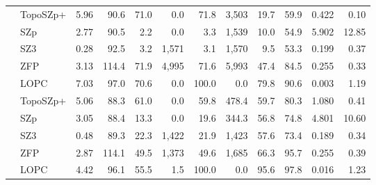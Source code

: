 \begin{tabular}{@{}llrrrrrrrrrr@{}}
\addlinespace[2pt]
\multirow{5}{*}{NYX} & TopoSZp+ & 5.96 & 90.6 & 71.0 & 0.0 & 71.8 & 3{,}503 & 19.7 & 59.9 & 0.422 & 0.10 \\
 & SZp & 2.77 & 90.5 & 2.2 & 0.0 & 3.3 & 1{,}539 & 10.0 & 54.9 & 5.902 & 12.85 \\
 & SZ3 & 0.28 & 92.5 & 3.2 & 1{,}571 & 3.1 & 1{,}570 & 9.5 & 53.3 & 0.199 & 0.37 \\
 & ZFP & 3.13 & 114.4 & 71.9 & 4{,}995 & 71.6 & 5{,}993 & 47.4 & 84.5 & 0.255 & 0.33 \\
 & LOPC & 7.03 & 97.0 & 70.6 & 0.0 & 100.0 & 0.0 & 79.8 & 90.6 & 0.003 & 1.19 \\
\addlinespace[2pt]
\multirow{5}{*}{SCALE} & TopoSZp+ & 5.06 & 88.3 & 61.0 & 0.0 & 59.8 & 478.4 & 59.7 & 80.3 & 1.080 & 0.41 \\
 & SZp & 3.05 & 88.4 & 13.3 & 0.0 & 19.6 & 344.3 & 56.8 & 74.8 & 4.801 & 10.60 \\
 & SZ3 & 0.48 & 89.3 & 22.3 & 1{,}422 & 21.9 & 1{,}423 & 57.6 & 73.4 & 0.189 & 0.34 \\
 & ZFP & 2.87 & 114.1 & 49.5 & 1{,}373 & 49.6 & 1{,}685 & 66.3 & 95.7 & 0.255 & 0.39 \\
 & LOPC & 4.42 & 96.1 & 55.5 & 1.5 & 100.0 & 0.0 & 95.6 & 97.8 & 0.016 & 1.23 \\
\bottomrule
\end{tabular}
